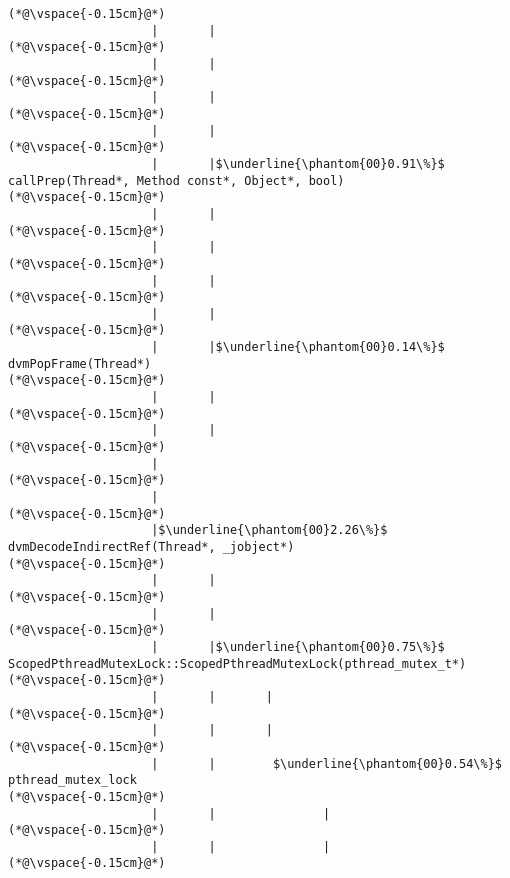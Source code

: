 \begin{lstlisting}[caption=Metodikutsu C$\to$Java 20 viiteparametrilla, label=profile:C2JBenchmark00206, numberbychapter=true, frame=lines, float, floatplacement=t]
(*@\vspace{-0.15cm}@*)
                    |       |        
(*@\vspace{-0.15cm}@*)
                    |       |        
(*@\vspace{-0.15cm}@*)
                    |       |
(*@\vspace{-0.15cm}@*)
                    |       |
(*@\vspace{-0.15cm}@*)
                    |       |$\underline{\phantom{00}0.91\%}$ callPrep(Thread*, Method const*, Object*, bool)
(*@\vspace{-0.15cm}@*)
                    |       |        
(*@\vspace{-0.15cm}@*)
                    |       |        
(*@\vspace{-0.15cm}@*)
                    |       |
(*@\vspace{-0.15cm}@*)
                    |       |
(*@\vspace{-0.15cm}@*)
                    |       |$\underline{\phantom{00}0.14\%}$ dvmPopFrame(Thread*)
(*@\vspace{-0.15cm}@*)
                    |       |
(*@\vspace{-0.15cm}@*)
                    |       |
(*@\vspace{-0.15cm}@*)
                    |
(*@\vspace{-0.15cm}@*)
                    |
(*@\vspace{-0.15cm}@*)
                    |$\underline{\phantom{00}2.26\%}$ dvmDecodeIndirectRef(Thread*, _jobject*)
(*@\vspace{-0.15cm}@*)
                    |       |
(*@\vspace{-0.15cm}@*)
                    |       |
(*@\vspace{-0.15cm}@*)
                    |       |$\underline{\phantom{00}0.75\%}$ ScopedPthreadMutexLock::ScopedPthreadMutexLock(pthread_mutex_t*)
(*@\vspace{-0.15cm}@*)
                    |       |       |
(*@\vspace{-0.15cm}@*)
                    |       |       |
(*@\vspace{-0.15cm}@*)
                    |       |        $\underline{\phantom{00}0.54\%}$ pthread_mutex_lock
(*@\vspace{-0.15cm}@*)
                    |       |               |
(*@\vspace{-0.15cm}@*)
                    |       |               |
(*@\vspace{-0.15cm}@*)

\end{lstlisting}
